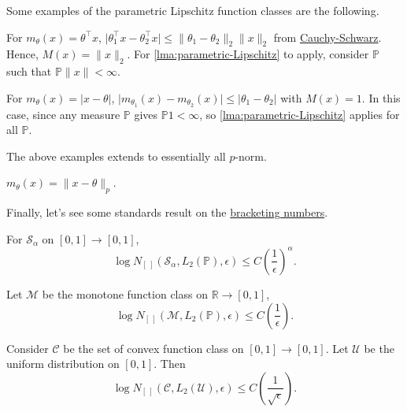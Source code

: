 Some examples of the parametric Lipschitz function classes are the following.

\begin{eg}
	For \(m_\theta (x) = \theta ^{\top} x\), \(\vert \theta _1 ^{\top} x - \theta _2 ^{\top} x \vert \leq \lVert \theta _1 - \theta _2 \rVert _2 \lVert x \rVert _2\) from \href{https://en.wikipedia.org/wiki/Cauchy-Schwarz_inequality}{Cauchy-Schwarz}. Hence, \(M(x) = \lVert x \rVert _2\). For \autoref{lma:parametric-Lipschitz} to apply, consider \(\mathbb{P} \) such that \(\mathbb{P} \lVert x \rVert < \infty \).
\end{eg}

\begin{eg}
	For \(m_\theta (x) = \vert x - \theta \vert \), \(\vert m_{\theta _1}(x) - m_{\theta _2}(x) \vert \leq \vert \theta _1 - \theta _2 \vert \) with \(M(x) =1\). In this case, since any measure \(\mathbb{P} \) gives \(\mathbb{P} 1 < \infty \), so \autoref{lma:parametric-Lipschitz} applies for all \(\mathbb{P} \).
\end{eg}

The above examples extends to essentially all \(p\)-norm.

\begin{eg}
	\(m_\theta (x) = \lVert x - \theta  \rVert _p\).
\end{eg}

Finally, let's see some standards result on the \hyperref[def:bracketing-number]{bracketing numbers}.

\begin{eg}
	For \(\mathcal{S} _\alpha \) on \([0, 1] \to [0, 1]\),
	\[
		\log N_{[\ ]}(\mathcal{S} _\alpha , L_2(\mathbb{P} ), \epsilon )
		\leq C\left( \frac{1}{\epsilon } \right) ^\alpha .
	\]
\end{eg}

\begin{eg}
	Let \(\mathcal{M} \) be the monotone function class on \(\mathbb{R} \to [0, 1]\),
	\[
		\log N_{[\ ]}(\mathcal{M} , L_2(\mathbb{P} ), \epsilon )
		\leq C \left( \frac{1}{\epsilon } \right).
	\]
\end{eg}

\begin{eg}
	Consider \(\mathcal{C} \) be the set of convex function class on \([0, 1] \to [0, 1]\). Let \(\mathcal{U} \) be the uniform distribution on \([0, 1]\). Then
	\[
		\log N_{[\ ]}(\mathscr{C} , L_2(\mathcal{U} ), \epsilon )
		\leq C \left( \frac{1}{\sqrt{\epsilon } } \right) .
	\]
\end{eg}

